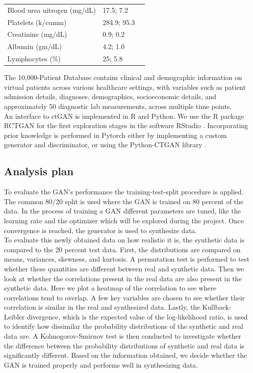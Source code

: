 \documentclass[review,12pt]{elsarticle}
\begin{document}
\begin{table}[h!]
\begin{tabular}{@{}lp{8cm}r@{}}
\hspace{1em} Blood urea nitrogen (mg/dL) & 17.5; 7.2 \\ 
\hspace{1em} Platelets (k/cumm) & 284.9; 95.3 \\ 
\hspace{1em} Creatinine (mg/dL) & 0.9; 0.2 \\ 
\hspace{1em} Albumin (gm/dL) & 4.2; 1.0 \\ 
\hspace{1em} Lymphocytes (\%) & 25; 5.8 \\ 
\bottomrule
\end{tabular}
\end{table}


The 10,000-Patient Database contains clinical and demographic information on virtual patients across various healthcare settings, with variables such as patient admission details, diagnoses, demographics, socioeconomic details, and approximately 50 diagnostic lab measurements, across multiple time points. 
\\
An interface to ctGAN is implemented in R and Python. We use the R package RCTGAN \cite{ctgan_r_package} for the first exploration stages in the software RStudio \cite{R}. Incorporating prior knowledge is performed in Pytorch \cite{NEURIPS2019_9015} either by implementing a custom generator and discriminator, or using the Python-CTGAN library \cite{SDV}.
\\
\subsection{Analysis plan}
To evaluate the GAN's performance the training-test-split procedure is applied. The common 80/20 split is used where the GAN is trained on 80 percent of the data. In the process of training a GAN different parameters are tuned, like the learning rate and the optimizer which will be explored during the project. Once convergence is reached, the generator is used to synthesize data. 
\\
To evaluate this newly obtained data on how realistic it is, the synthetic data is compared to the 20 percent test data. First, the distributions are compared on means, variances, skewness, and kurtosis. A permutation test is performed to test whether these quantities are different between real and synthetic data. Then we look at whether the correlations present in the real data are also present in the synthetic data. Here we plot a heatmap of the correlation to see where correlations tend to overlap. A few key variables are chosen to see whether their correlation is similar in the real and synthesized data. Lastly, the Kullback-Leibler divergence, which is the expected value of the log-likelihood ratio, is used to identify how dissimilar the probability distributions of the synthetic and real data are. A Kolmogorov-Smirnov test is then conducted to investigate whether the difference between the probability distributions of synthetic and real data is significantly different. Based on the information obtained, we decide whether the GAN is trained properly and performs well in synthesizing data.

 

\newpage


\end{document}
